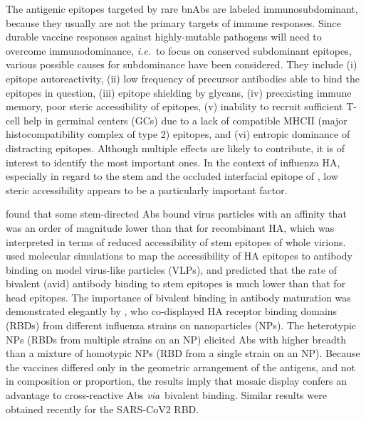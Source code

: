 \documentclass[utf8]{frontiersHLTH}%
\def\ie {{\it i.e.}}
\def\via {{\it via}}
\begin{document}
The antigenic epitopes targeted by rare bnAbs are labeled immunosubdominant, because
they usually are not the primary targets of immune responses.
Since durable vaccine responses against highly-mutable pathogens will need
to overcome immunodominance, \ie~to focus on conserved subdominant epitopes,
various possible causes for subdominance have been considered. They include
(i) epitope autoreactivity,\cite{bajic19a} (ii) low frequency of precursor
antibodies able to bind the epitopes in question,\cite{andrews15} (iii)
epitope shielding by glycans,\cite{bajic19} (iv) preexisting immune
memory,\cite{andrews15,arevalo20} poor steric accessibility of
epitopes\cite{amitai20}, (v) inability to recruit sufficient T-cell help
in germinal centers (GCs) due to a lack of compatible MHCII (major histocompatibility complex of type 2) epitopes,\cite{tan19}
and (vi) entropic dominance of distracting epitopes.\cite{wang17,amitai20,glanville20}
Although multiple effects are likely to contribute, it
is of interest to identify the most important ones. In the
context of influenza HA, especially in regard to the stem and the occluded
interfacial epitope of \citet{watanabe19}, low steric accessibility appears
to be a particularly important factor.

\citet{andrews15} found that some stem-directed Abs bound
virus particles with an affinity that was an order of magnitude lower than that for
recombinant HA, which was interpreted in terms of reduced accessibility of
stem epitopes of whole virions.
\citet{amitai20} used molecular simulations to map the accessibility
of HA epitopes to antibody binding on model virus-like particles (VLPs),
and predicted that the rate of bivalent (avid) antibody binding to stem
epitopes is much lower than that for head epitopes.
The importance of bivalent binding in antibody maturation was
demonstrated elegantly by \citet{kanekiyo19}, who co-displayed HA
receptor binding domains (RBDs) from different influenza strains on
nanoparticles (NPs). The heterotypic NPs (RBDs from multiple strains on an NP)
elicited Abs with higher breadth than a mixture of homotypic NPs (RBD from a single
strain on an NP). Because the vaccines differed only in the geometric
arrangement of the antigens, and not in composition or proportion, the results imply
that mosaic display confers an advantage to cross-reactive Abs
\via~bivalent binding\cite{kanekiyo19}. Similar results were obtained recently for the
SARS-CoV2 RBD.\cite{cohen21}
\end{document}
